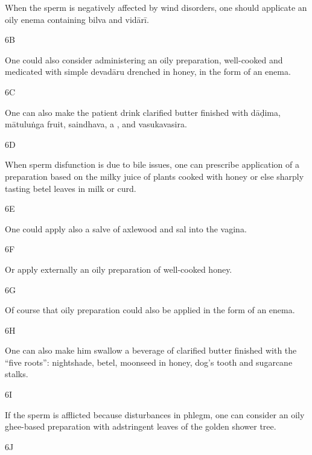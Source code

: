 \begin{translation}
  When the sperm is negatively affected by wind disorders, one should applicate 
  an oily enema containing \gls{bilva} and \gls{vidārī}. 
 
 \item[6B]
 
  One could also consider administering an oily preparation, well-cooked and 
  medicated with simple \gls{devadāru} drenched in honey, in the form of an 
  enema. 
 
 \item[6C]
 
  One can also make the patient drink clarified butter finished with \gls{dāḍima}, 
  \gls{mātuluṅga} fruit, \gls{saindhava}, a , and 
  \gls{vasukavasira}.
 
 
 \item[6D]
 
   When sperm disfunction is due to bile issues, one can prescribe application of 
   a preparation based on the milky juice of plants cooked with honey or else 
   sharply tasting betel leaves in milk or curd.
 
 \item[6E]
 
  One could apply also a salve of axlewood and sal into the vagina.
 
 \item[6F]
 
  Or apply externally an oily preparation of well-cooked honey.
 
 \item[6G]
 
  Of course that oily preparation could also be applied in the form of an enema.
 
 \item[6H]
 
  One can also make him swallow a beverage of clarified butter finished with the 
  “five roots”: nightshade, betel, moonseed in honey, dog’s tooth and sugarcane 
  stalks. 
 
 \item[6I]
 
  If the sperm is afflicted because disturbances in phlegm, one can consider an 
  oily ghee-based preparation with adstringent leaves of the golden shower tree.
 
 \item[6J]
 

\end{translation}
